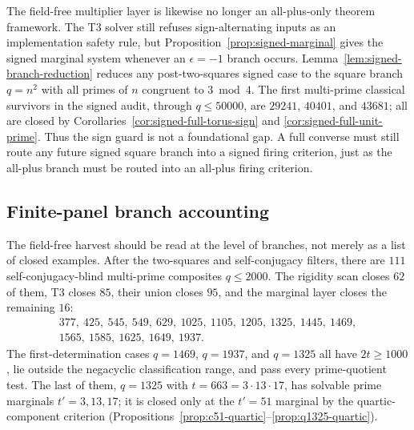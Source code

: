 \documentclass[11pt]{article}
\theoremstyle{plain}
\theoremstyle{definition}
\theoremstyle{remark}
\begin{document}
The field-free multiplier layer is likewise no longer an all-plus-only theorem
framework.  The T3 solver still refuses sign-alternating inputs as an
implementation safety rule, but Proposition~\ref{prop:signed-marginal} gives
the signed marginal system whenever an $\epsilon=-1$ branch occurs.
Lemma~\ref{lem:signed-branch-reduction} reduces any post-two-squares signed
case to the square branch $q=n^2$ with all primes of $n$ congruent to
$3\bmod4$.  The first multi-prime classical survivors in the signed audit,
through $q\le50000$, are $29241$, $40401$, and $43681$; all are closed by
Corollaries~\ref{cor:signed-full-torus-sign} and
\ref{cor:signed-full-unit-prime}.  Thus the sign guard is not a foundational
gap.  A full converse must still route any future signed square branch into a
signed firing criterion, just as the all-plus branch must be routed into an
all-plus firing criterion.

\subsection{Finite-panel branch accounting}\label{sec:finite-panel-accounting}

The field-free harvest should be read at the level of branches, not merely as a
list of closed examples.  After the two-squares and self-conjugacy filters,
there are $111$ self-conjugacy-blind multi-prime composites $q\le2000$.  The
rigidity scan closes $62$ of them, T3 closes $85$, their union closes $95$, and
the marginal layer closes the remaining $16$:
\[
\begin{gathered}
377,\ 425,\ 545,\ 549,\ 629,\ 1025,\ 1105,\ 1205,\ 1325,\ 1445,\ 1469,\\
1565,\ 1585,\ 1625,\ 1649,\ 1937 .
\end{gathered}
\]
The first-determination cases $q=1469$, $q=1937$, and $q=1325$ all have
$2t\ge1000$, lie outside the negacyclic classification range, and pass every
prime-quotient test.  The last of them, $q=1325$ with
$t=663=3\cdot13\cdot17$, has solvable prime marginals $t'=3,13,17$; it is
closed only at the $t'=51$ marginal by the quartic-component criterion
(Propositions~\ref{prop:c51-quartic}--\ref{prop:q1325-quartic}).
\end{document}
